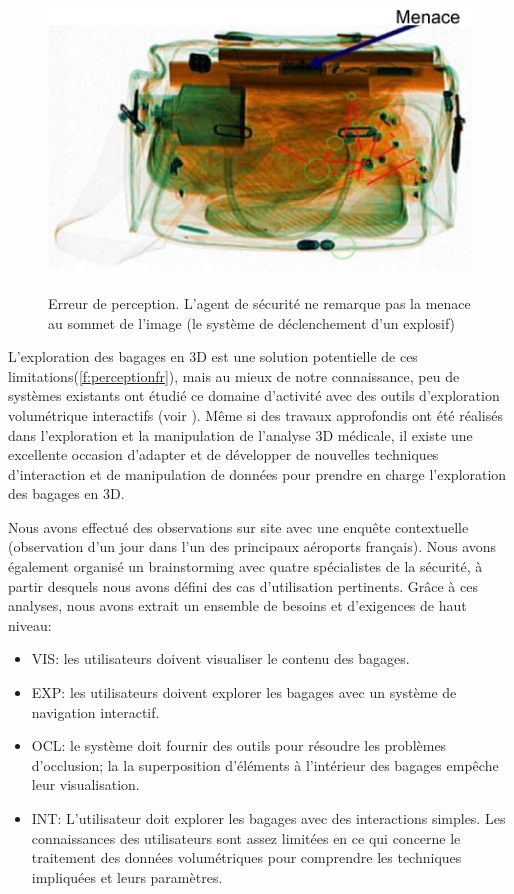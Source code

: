 \begin{figure}
\centering
	\includegraphics[height=8cm]{Figures/perceptionError}
	\caption{Erreur de perception. L'agent de sécurité ne remarque pas la menace au sommet de l'image (le système de déclenchement d'un explosif) }
	\label{f:perceptionfr}
\end{figure}

L’exploration des bagages en 3D est une solution potentielle de ces limitations(\autoref{f:perceptionfr}), mais au mieux de notre connaissance, peu de systèmes existants ont étudié ce domaine d’activité avec des outils d’exploration volumétrique interactifs (voir \cite{Li:2012:LVV:2425296.2425325}). Même si des travaux approfondis ont été réalisés dans l'exploration et la manipulation de l'analyse 3D médicale, il existe une excellente occasion  d'adapter et de développer de nouvelles techniques d'interaction et de manipulation de données pour prendre en charge l'exploration des bagages en 3D.

Nous avons effectué des observations sur site avec une enquête contextuelle (observation d'un jour dans l'un des principaux aéroports français). Nous avons également organisé un brainstorming avec quatre spécialistes de la sécurité, à partir desquels nous avons défini des cas d'utilisation pertinents. Grâce à ces analyses, nous avons extrait un ensemble de besoins et d'exigences de haut niveau:
\begin{itemize}
\item VIS: les utilisateurs doivent visualiser le contenu des bagages.
\item EXP: les utilisateurs doivent explorer les bagages avec un système de navigation interactif.
\item  OCL: le système doit fournir des outils pour résoudre les problèmes d’occlusion; la
la superposition d'éléments à l'intérieur des bagages empêche leur visualisation.  
\item INT: L'utilisateur doit explorer les bagages avec des interactions simples. Les connaissances des utilisateurs sont assez limitées en ce qui concerne le traitement des données volumétriques pour comprendre les techniques impliquées et leurs paramètres.

\end{itemize}




